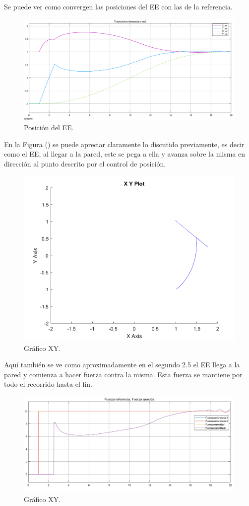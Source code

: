 Se puede ver como convergen las posiciones del EE con las de la referencia.
\begin{figure}[H]
	\centering
	\includegraphics[width=0.8\linewidth]{ImagenesControl híbrido no lineal/3_3_b}
	\caption{Posición  del EE.}	
	\label{fig:cpos}
\end{figure}

En la Figura () se puede apreciar claramente lo discutido previamente, es decir como el EE, al llegar a la pared, este se pega a ella y avanza sobre la misma en dirección al punto descrito por el control de posición.

\begin{figure}[H]
	\centering
	\includegraphics[width=0.5\linewidth]{ImagenesControl híbrido no lineal/3_3_c}
	\caption{Gráfico XY.}	
	\label{fig:cxy}
\end{figure}

Aquí también se ve como aproximadamente en el segundo 2.5 el EE llega a la pared y comienza a hacer fuerza contra la misma. Esta fuerza se mantiene por todo el recorrido hasta el fin.

\begin{figure}[H]
	\centering
	\includegraphics[width=0.8\linewidth]{ImagenesControl híbrido no lineal/3_3_e}
	\caption{Gráfico XY.}	
	\label{fig:cf}
\end{figure}

